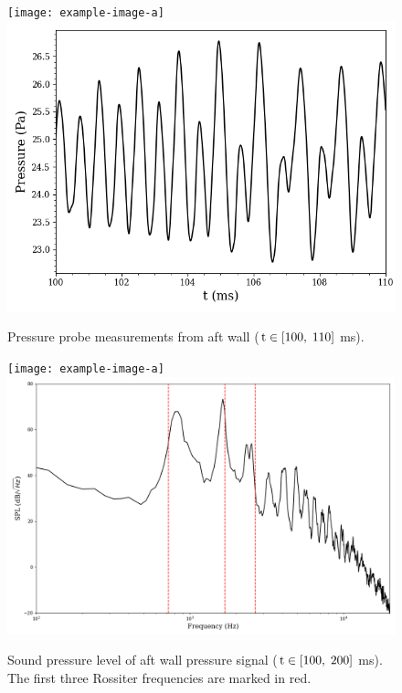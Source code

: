 \begin{figure}
	\begin{minipage}{0.48\linewidth}
		\ifdefined\DRAFT
			\texttt{[image: example-image-a]}
		\else
			\includegraphics[width=0.99\linewidth,trim={0.5em 0.5em 0.5em 0.5em},clip]{Chapters/CavityAndCVRC/Images/cavity/pressure_probe_fom_10ms.png}
		\fi
		\caption{\label{fig:cavityFOMProbe}Pressure probe measurements from aft wall ($\text{t} \in [100, \; 110]$ ms).}
	\end{minipage} \hspace{0.5em}
	\begin{minipage}{0.48\linewidth}
		\ifdefined\DRAFT
			\texttt{[image: example-image-a]}
		\else
			\includegraphics[width=0.99\linewidth,trim={0.5em 0.5em 0.5em 0.5em},clip]{Chapters/CavityAndCVRC/Images/cavity/psd_fom_100ms.png}
		\fi
		\caption{\label{fig:rossiterModeProof}Sound pressure level of aft wall pressure signal ($\text{t} \in [100, \; 200]$ ms). The first three Rossiter frequencies are marked in red.}
	\end{minipage}
\end{figure}

